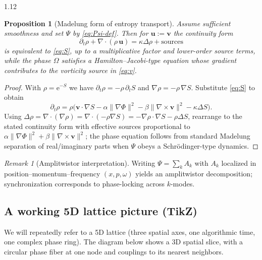 \documentclass[12pt,a4paper]{article}
\numberwithin{equation}{section}
\newtheorem{proposition}{Proposition}[section]
\theoremstyle{remark}
\newtheorem{remark}{Remark}[section]
\theoremstyle{definition}
\newcommand{\ee}{\mathrm{e}}
\begin{document}
\begin{spacing}{1.12}
\begin{proposition}[Madelung form of entropy transport]
\label{prop:madelung}
Assume sufficient smoothness and set $\Psi$ by \eqref{eq:Psi-def}. Then for $\mathbf{u}:=\mathbf{v}$ the continuity form
\[
\partial_t \rho + \nabla\!\cdot(\rho\,\mathbf{u}) = \kappa\Delta \rho + \text{sources}
\]
is equivalent to \eqref{eq:S}, up to a multiplicative factor and lower-order source terms, while the phase $\Omega$ satisfies a Hamilton--Jacobi-type equation whose gradient contributes to the vorticity source in \eqref{eq:v}.
\end{proposition}

\begin{proof}
With $\rho=\ee^{-S}$ we have $\partial_t \rho = -\rho\,\partial_t S$ and $\nabla \rho = -\rho\,\nabla S$. Substitute \eqref{eq:S} to obtain
\[
\partial_t \rho = \rho \big(\mathbf{v}\!\cdot\nabla S - \alpha\|\nabla\Phi\|^2 - \beta\|\nabla\times \mathbf{v}\|^2 - \kappa\Delta S\big).
\]
Using $\Delta \rho = \nabla\!\cdot(\nabla \rho)= \nabla\!\cdot(-\rho\nabla S)= -\nabla\rho\!\cdot\nabla S-\rho \Delta S$, rearrange to the stated continuity form with effective sources proportional to $\alpha\|\nabla\Phi\|^2+\beta\|\nabla\times \mathbf{v}\|^2$; the phase equation follows from standard Madelung separation of real/imaginary parts when $\Psi$ obeys a Schrödinger-type dynamics.  
\end{proof}

\begin{remark}[Amplitwistor interpretation]
Writing $\Psi=\sum_k A_k$ with $A_k$ localized in position--momentum--frequency $(x,p,\omega)$ yields an amplitwistor decomposition; synchronization corresponds to phase-locking across $k$-modes.
\end{remark}

\subsection{A working 5D lattice picture (TikZ)}
\label{subsec:lattice-picture}

We will repeatedly refer to a 5D lattice (three spatial axes, one algorithmic time, one complex phase ring). The diagram below shows a 3D spatial slice, with a circular phase fiber at one node and couplings to its nearest neighbors.

\begin{figure}[H]
\centering
{}
\end{figure}
\end{spacing}
\end{document}
